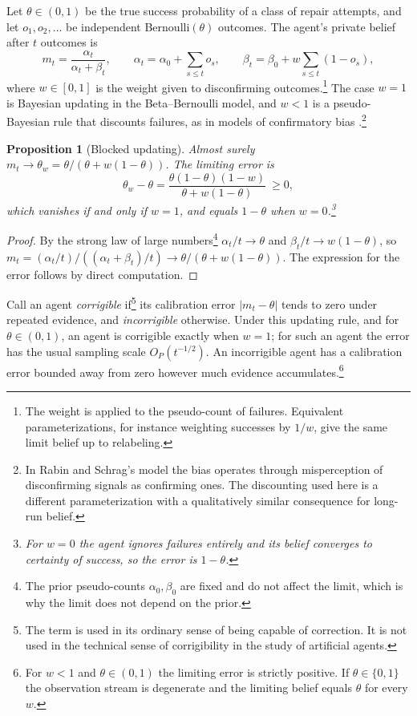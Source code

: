 \documentclass[11pt]{article}
\newtheorem{proposition}{Proposition}
\theoremstyle{remark}
\begin{document}
Let $\theta\in(0,1)$ be the true success probability of a class of repair attempts, and let $o_1,o_2,\dots$ be independent Bernoulli$(\theta)$ outcomes. The agent's private belief after $t$ outcomes is
\[
m_t=\frac{\alpha_t}{\alpha_t+\beta_t},\qquad
\alpha_t=\alpha_0+\sum_{s\le t}o_s,\qquad
\beta_t=\beta_0+w\sum_{s\le t}(1-o_s),
\]
where $w\in[0,1]$ is the weight given to disconfirming outcomes.\footnote{The weight is applied to the pseudo-count of failures. Equivalent parameterizations, for instance weighting successes by $1/w$, give the same limit belief up to relabeling.} The case $w=1$ is Bayesian updating in the Beta--Bernoulli model, and $w<1$ is a pseudo-Bayesian rule that discounts failures, as in models of confirmatory bias \cite{rabin}.\footnote{In Rabin and Schrag's model the bias operates through misperception of disconfirming signals as confirming ones. The discounting used here is a different parameterization with a qualitatively similar consequence for long-run belief.}

\begin{proposition}[Blocked updating]
Almost surely $m_t\to\theta_w=\theta/(\theta+w(1-\theta))$. The limiting error is
\[
\theta_w-\theta=\frac{\theta(1-\theta)(1-w)}{\theta+w(1-\theta)}\ \ge0,
\]
which vanishes if and only if $w=1$, and equals $1-\theta$ when $w=0$.\footnote{For $w=0$ the agent ignores failures entirely and its belief converges to certainty of success, so the error is $1-\theta$.}
\end{proposition}

\begin{proof}
By the strong law of large numbers\footnote{The prior pseudo-counts $\alpha_0,\beta_0$ are fixed and do not affect the limit, which is why the limit does not depend on the prior.} $\alpha_t/t\to\theta$ and $\beta_t/t\to w(1-\theta)$, so $m_t=(\alpha_t/t)/((\alpha_t+\beta_t)/t)\to\theta/(\theta+w(1-\theta))$. The expression for the error follows by direct computation.
\end{proof}

Call an agent \emph{corrigible} if\footnote{The term is used in its ordinary sense of being capable of correction. It is not used in the technical sense of corrigibility in the study of artificial agents.} its calibration error $|m_t-\theta|$ tends to zero under repeated evidence, and \emph{incorrigible} otherwise. Under this updating rule, and for $\theta\in(0,1)$, an agent is corrigible exactly when $w=1$; for such an agent the error has the usual sampling scale $O_P(t^{-1/2})$. An incorrigible agent has a calibration error bounded away from zero however much evidence accumulates.\footnote{For $w<1$ and $\theta\in(0,1)$ the limiting error is strictly positive. If $\theta\in\{0,1\}$ the observation stream is degenerate and the limiting belief equals $\theta$ for every $w$.}
\end{document}
